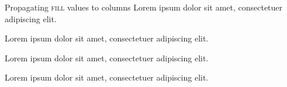 \documentclass[xcolor=dvipsnames,compress,9pt]{beamer}
\begin{document}
\begin{frame}{Propagating \textsc{fill} values to columns}
Lorem ipsum dolor sit amet, consectetuer adipiscing elit.
\par
Lorem ipsum dolor sit amet, consectetuer adipiscing elit.

\begin{minipage}[t][.2\textheight][t]{\textwidth}
Lorem ipsum dolor sit amet, consectetuer adipiscing elit.
\par
Lorem ipsum dolor sit amet, consectetuer adipiscing elit.
\end{minipage}
\end{frame}
\end{document}
